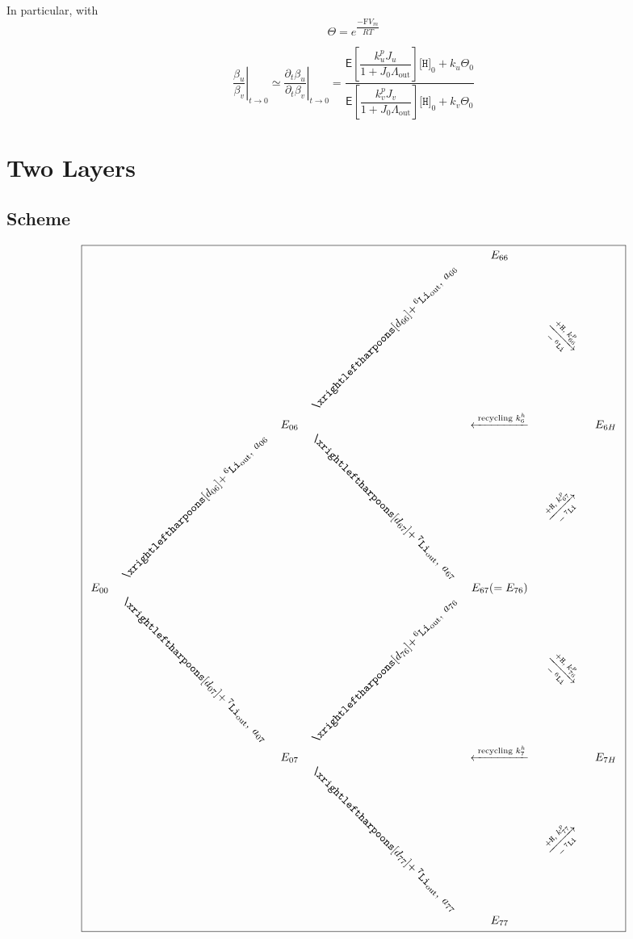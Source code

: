 \documentclass[aps,onecolumn,11pt]{revtex4}
\newcommand{\mychem}[1]{\mathtt{#1}}
\newcommand{\myconc}[1]{\big[#1\big]}
\newcommand{\Faraday}{\mathrm{F}}
\newcommand{\spLi}[1]{{\!~^{#1}\mychem{Li}}}
\newcommand{\spproton}{\mychem{H}}
\newcommand{\proton}{\myconc{\spproton}}
\newcommand{\myout}[1]{{#1}_{\mathrm{out}}}
\newcommand{\spLiOut}[1]{\myout{\spLi{#1}}}
\newcommand{\myrotate}[2]{\rotatebox[origin=c]{#1}{#2}}
\newcommand{\LiAll}{\Lambda}
\newcommand{\LiAllOut}{\myout{\LiAll}}
\begin{document}
In particular, with
\begin{equation}
	\Theta = e^{\dfrac{-\Faraday V_m }{RT}}
\end{equation}

\begin{equation}
	\left.\dfrac{\beta_u}{\beta_v}\right\vert_{t\to0} \simeq \left.\dfrac{\partial_t \beta_u}{\partial_t\beta_v}\right\vert_{t\to0}
	= \dfrac{\mathsf{E} \left[\dfrac{k^p_u J_u}{1+J_0 \LiAllOut}\right] \proton_0 + k_u  \Theta_0
	}
	{
	\mathsf{E} \left[\dfrac{k^p_v J_v}{1+J_0 \LiAllOut}\right] \proton_0 + k_v  \Theta_0
	}
\end{equation}


\section{Two Layers}
\subsection{Scheme}
{
\Large
\begin{equation}
\boxed{
\begin{array}{ccccccc}
 & &        &                                                  & E_{66} & & \\
 & &        & \myrotate{45}{$\xrightleftharpoons[d_{66}]{+\spLiOut{6},\;a_{66}}$} & &  \myrotate{-45}{$\xrightarrow[-\spLi{6}]{+ \spproton, \; k^p_{66}}$}& \\
 & & E_{06} &  & \xleftarrow{\text{ recycling } k^h_6 } & & E_{6H}\\
 &  \myrotate{45}{$\xrightleftharpoons[d_{06}]{+\spLiOut{6},\;a_{06}}$} &   & \myrotate{-45}{$\xrightleftharpoons[d_{67}]{+\spLiOut{7},\;a_{67}}$} & & \myrotate{45}{$\xrightarrow[-\spLi{7}]{+ \spproton, \; k^p_{67}}$}&\\
E_{00} & &  & & E_{67}(=E_{76}) & & \\ 
  & \myrotate{-45}{$\xrightleftharpoons[d_{07}]{+\spLiOut{7},\;a_{07}}$} &  & \myrotate{45}{$\xrightleftharpoons[d_{76}]{+\spLiOut{6},\;a_{76}}$} & & \myrotate{-45}{$\xrightarrow[-\spLi{6}]{+ \spproton, \; k^p_{76}}$} & \\
  & & E_{07} &   & \xleftarrow{\text{ recycling } k^h_7 } & & E_{7H}\\
  & &  & \myrotate{-45}{$\xrightleftharpoons[d_{77}]{+\spLiOut{7},\;a_{77}}$} & & \myrotate{45}{$\xrightarrow[-\spLi{7}]{+ \spproton, \; k^p_{77}}$} &\\
  & &  &  & E_{77} & &\\

 \end{array}
 }
\end{equation}
}
\end{document}
